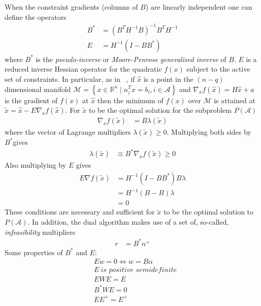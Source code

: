 \documentclass[a4paper,twoside,10pt,english]{report}
\begin{document}
When the constraint gradients (columns of $B$) are linearly independent
one can define the operators
\begin{align*}
B^{*} &= \left(B^{T}H^{-1}B\right)^{-1}B^{T}H^{-1}\\
E &= H^{-1}\left(I-BB^{*}\right)
\end{align*}
where $B^{*}$ is the \emph{pseudo-inverse} or \emph{Moore-Penrose}
\emph{generalised inverse} of $B$. $E$ is a reduced inverse Hessian
operator for the quadratic $f\left(x\right)$ subject to the active
set of constraints. In particular, as in 
~\cite{GoldfarbIdnani_NumericallyStableDualQuadraticPrograms},
if $\hat{x}$ is a point in the $\left(n-q\right)$ dimensional manifold
$\mathcal{M}=\left\{ x\in\mathfrak{\mathbb{R}}^{n}\mid n_{i}^{T}x=b_{i},i\in\mathcal{A}\right\}$
and $\nabla_{x}f\left(\hat{x}\right)=H\hat{x}+a$ is the gradient
of $f\left(x\right)$ at $\hat{x}$ then the minimum of $f\left(x\right)$
over $\mathcal{M}$ is attained at
$\tilde{x}=\hat{x}-E\nabla_{x}f\left(\hat{x}\right)$.
For $\tilde{x}$ to be the optimal solution for the subproblem
$P\left(\mathcal{A}\right)$
\begin{align*}
\nabla_{x}f\left(\tilde{x}\right) &= B\lambda\left(\tilde{x}\right)
\end{align*}
where the vector of Lagrange multipliers $\lambda\left(\tilde{x}\right)\ge0$.
Multiplying both sides by $B^{*}$gives 
\begin{align*}
\lambda\left(\tilde{x}\right) & \equiv B^{*}\nabla_{x}f\left(\tilde{x}\right)\ge0
\end{align*}
Also multiplying by $E$ gives 
\begin{align*}
E\nabla f\left(\tilde{x}\right) &= H^{-1}\left(I-BB^{*}\right)B\lambda\\
 &= H^{-1}\left(B-B\right)\lambda\\
 &= 0
\end{align*}
These conditions are necessary and sufficient for $\tilde{x}$ to
be the optimal solution to $P\left(\mathcal{A}\right)$. In addition,
the dual algorithm makes use of a set of, so-called, \emph{infeasibility}
multipliers
\begin{align*}
r &= B^{*}n^{+}
\end{align*}
Some properties of $B^{*}$ and $E$:
\begin{align*}
 & Ew=0\Leftrightarrow w=B\alpha\\
 & E ~ \textit{is positive semidefinite}\\
 & EWE=E\\
 & B^{*}WE=0\\
 & EE^{+}=E^{+}
\end{align*}
\end{document}
